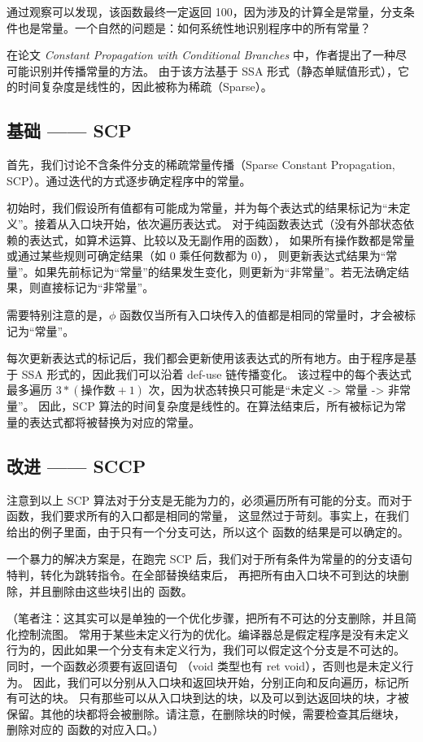 通过观察可以发现，该函数最终一定返回 100，因为涉及的计算全是常量，分支条件也是常量。一个自然的问题是：如何系统性地识别程序中的所有常量？

在论文 \textit{Constant Propagation with Conditional Branches}\cite{SCCP} 中，作者提出了一种尽可能识别并传播常量的方法。
由于该方法基于 SSA 形式（静态单赋值形式），它的时间复杂度是线性的，因此被称为稀疏（Sparse）。

\subsection{基础 —— SCP}

首先，我们讨论不含条件分支的稀疏常量传播（Sparse Constant Propagation, SCP）。通过迭代的方式逐步确定程序中的常量。

初始时，我们假设所有值都有可能成为常量，并为每个表达式的结果标记为“未定义”。接着从入口块开始，依次遍历表达式。
对于纯函数表达式（没有外部状态依赖的表达式，如算术运算、比较以及无副作用的函数），
如果所有操作数都是常量或通过某些规则可确定结果（如 $0$ 乘任何数都为 $0$），
则更新表达式结果为“常量”。如果先前标记为“常量”的结果发生变化，则更新为“非常量”。若无法确定结果，则直接标记为“非常量”。

需要特别注意的是，$\phi$ 函数仅当所有入口块传入的值都是相同的常量时，才会被标记为“常量”。

每次更新表达式的标记后，我们都会更新使用该表达式的所有地方。由于程序是基于 SSA 形式的，因此我们可以沿着 def-use 链传播变化。
该过程中的每个表达式最多遍历 $3 * (\text{操作数} + 1)$ 次，因为状态转换只可能是“未定义 -> 常量 -> 非常量”。
因此，SCP 算法的时间复杂度是线性的。在算法结束后，所有被标记为常量的表达式都将被替换为对应的常量。

\subsection{改进 —— SCCP}

注意到以上 SCP 算法对于分支是无能为力的，必须遍历所有可能的分支。而对于  函数，我们要求所有的入口都是相同的常量，
这显然过于苛刻。事实上，在我们给出的例子里面，由于只有一个分支可达，所以这个  函数的结果是可以确定的。

一个暴力的解决方案是，在跑完 SCP 后，我们对于所有条件为常量的的分支语句特判，转化为跳转指令。在全部替换结束后，
再把所有由入口块不可到达的块删除，并且删除由这些块引出的  函数。

（笔者注：这其实可以是单独的一个优化步骤，把所有不可达的分支删除，并且简化控制流图。
常用于某些未定义行为的优化。编译器总是假定程序是没有未定义行为的，因此如果一个分支有未定义行为，我们可以假定这个分支是不可达的。
同时，一个函数必须要有返回语句 （void 类型也有 ret void），否则也是未定义行为。
因此，我们可以分别从入口块和返回块开始，分别正向和反向遍历，标记所有可达的块。
只有那些可以从入口块到达的块，以及可以到达返回块的块，才被保留。其他的块都将会被删除。请注意，在删除块的时候，需要检查其后继块，
删除对应的  函数的对应入口。）

